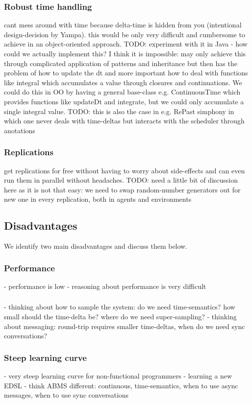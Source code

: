 \subsubsection{Robust time handling}
cant mess around with time because delta-time is hidden from you (intentional design-decision by Yampa). this would be only very difficult and cumbersome to achieve in an object-oriented approach. TODO: experiment with it in Java - how could we actually implement this? I think it is impossible: may only achieve this through complicated application of patterns and inheritance but then has the problem of how to update the dt and more important how to deal with functions like integral which accumulates a value through closures and continuations. We could do this in OO by having a general base-class e.g. ContinuousTime which provides functions like updateDt and integrate, but we could only accumulate a single integral value.
TODO: this is also the case in e.g. RePast simphony in which one never deals with time-deltas but interacts with the scheduler through anotations

\subsubsection{Replications}
get replications for free without having to worry about side-effects and can even run them in parallel without headaches. TODO: need a little bit of discussion here as it is not that easy: we need to swap random-number generators out for new one in every replication, both in agents and environments

\subsection{Disadvantages}
We identify two main disadvantages and discuss them below.

\subsubsection{Performance}
	- performance is low
	- reasoning about performance is very difficult

\subsubsection{}
- thinking about how to sample the system: do we need time-semantics? how small should the time-delta be? where do we need super-sampling?
- thinking about messaging: round-trip requires smaller time-deltas, when do we need sync conversations?

\subsubsection{Steep learning curve}
	- very steep learning curve for non-functional programmers
	- learning a new EDSL
	- think ABMS different: continuous, time-semantics, when to use async messages, when to use sync conversations